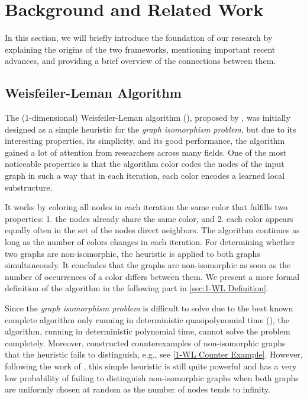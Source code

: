 \section{Background and Related Work}\label{sec:related_work}
In this section, we will briefly introduce the foundation of our research by explaining the origins of the two frameworks, mentioning important recent advances, and providing a brief overview of the connections between them.

\subsection{Weisfeiler-Leman Algorithm}
The (1-dimensional) Weisfeiler-Leman algorithm (\wl), proposed by \cite{Wei+1968}, was initially designed as a simple heuristic for the \textit{graph isomorphism problem}, but due to its interesting properties, its simplicity, and its good performance, the \wl algorithm gained a lot of attention from researchers across many fields. One of the most noticeable properties is that the algorithm color codes the nodes of the input graph in such a way that in each iteration, each color encodes a learned local substructure.

It works by coloring all nodes in each iteration the same color that fulfills two properties: 1. the nodes already share the same color, and 2. each color appears equally often in the set of the nodes direct neighbors. The algorithm continues as long as the number of colors changes in each iteration.
For determining whether two graphs are non-isomorphic, the heuristic is applied to both graphs simultaneously. It concludes that the graphs are non-isomorphic as soon as the number of occurrences of a color differs between them. We present a more formal definition of the algorithm in the following part in \cref{sec:1-WL Definition}.

Since the \textit{graph isomorphism problem} is difficult to solve due to the best known complete algorithm only running in deterministic quasipolynomial time (\cite{Babai2016}), the \wl algorithm, running in deterministic polynomial time, cannot solve the problem completely. Moreover, \cite{Cai1992} constructed counterexamples of non-isomorphic graphs that the heuristic fails to distinguish, e.g., see \cref{1-WL Counter Example}. However, following the work of \cite{Bab+1979}, this simple heuristic is still quite powerful and has a very low probability of failing to distinguish non-isomorphic graphs when both graphs are uniformly chosen at random as the number of nodes tends to infinity.

